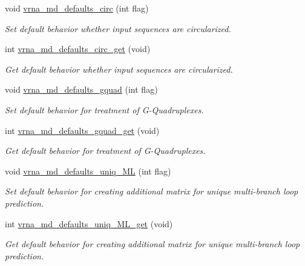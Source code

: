 \begin{DoxyCompactItemize}
void \mbox{\hyperlink{group__model__details_ga4e1deb3e91a8a99e5c6dd905a5eb0186}{vrna\+\_\+md\+\_\+defaults\+\_\+circ}} (int flag)
\begin{DoxyCompactList}\small\item\em Set default behavior whether input sequences are circularized. \end{DoxyCompactList}\item 
int \mbox{\hyperlink{group__model__details_gad3a7e58de344ad93a08925f58f94f6fb}{vrna\+\_\+md\+\_\+defaults\+\_\+circ\+\_\+get}} (void)
\begin{DoxyCompactList}\small\item\em Get default behavior whether input sequences are circularized. \end{DoxyCompactList}\item 
void \mbox{\hyperlink{group__model__details_ga0685ca2aeb39af76f2421fc308163dce}{vrna\+\_\+md\+\_\+defaults\+\_\+gquad}} (int flag)
\begin{DoxyCompactList}\small\item\em Set default behavior for treatment of G-\/\+Quadruplexes. \end{DoxyCompactList}\item 
int \mbox{\hyperlink{group__model__details_gae645b8612f879eb38b45244fa9eddb9e}{vrna\+\_\+md\+\_\+defaults\+\_\+gquad\+\_\+get}} (void)
\begin{DoxyCompactList}\small\item\em Get default behavior for treatment of G-\/\+Quadruplexes. \end{DoxyCompactList}\item 
void \mbox{\hyperlink{group__model__details_ga59b944f61c5d2babec2d4c48c820de67}{vrna\+\_\+md\+\_\+defaults\+\_\+uniq\+\_\+\+ML}} (int flag)
\begin{DoxyCompactList}\small\item\em Set default behavior for creating additional matrix for unique multi-\/branch loop prediction. \end{DoxyCompactList}\item 
int \mbox{\hyperlink{group__model__details_gab48e70fd024bf838404bcbcca0c874a0}{vrna\+\_\+md\+\_\+defaults\+\_\+uniq\+\_\+\+M\+L\+\_\+get}} (void)
\begin{DoxyCompactList}\small\item\em Get default behavior for creating additional matrix for unique multi-\/branch loop prediction. \end{DoxyCompactList}\item 

\end{DoxyCompactItemize}
